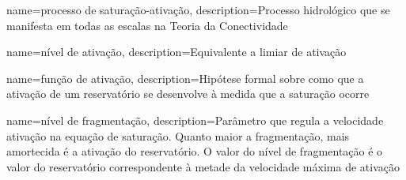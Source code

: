 {
    name=processo de saturação-ativação,
    description={Processo hidrológico que se manifesta em todas as escalas na Teoria da Conectividade}
}

{
    name=nível de ativação,
    description={Equivalente a limiar de ativação}
}

{
    name=função de ativação,
    description={Hipótese formal sobre como que a ativação de um reservatório se desenvolve à medida que a saturação ocorre}
}

{
    name=nível de fragmentação,
    description={Parâmetro que regula a velocidade ativação na equação de saturação. Quanto maior a fragmentação, mais amortecida é a ativação do reservatório. O valor do nível de fragmentação é o valor do reservatório correspondente à metade da velocidade máxima de ativação}
}
